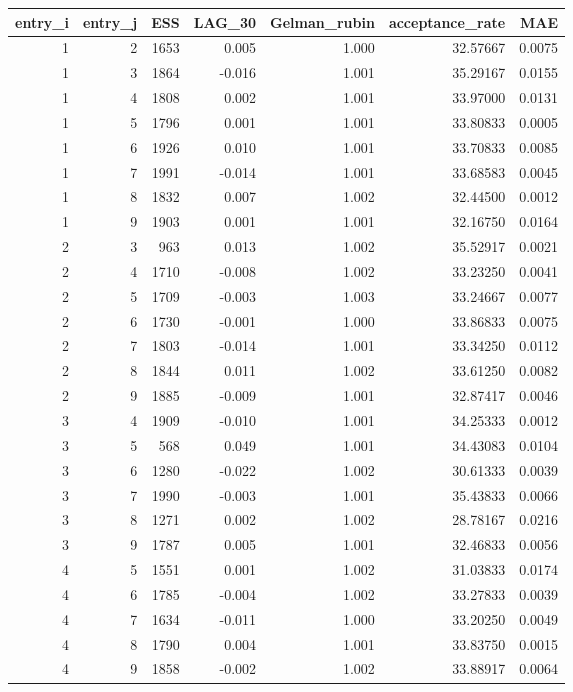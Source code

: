 \begin{longtable}{rrrrrrr}
\toprule
entry\_i & entry\_j & ESS & LAG\_30 & Gelman\_rubin & acceptance\_rate & MAE \\ 
\midrule
1 & 2 & 1653 & 0.005 & 1.000 & 32.57667 & 0.0075 \\ 
1 & 3 & 1864 & -0.016 & 1.001 & 35.29167 & 0.0155 \\ 
1 & 4 & 1808 & 0.002 & 1.001 & 33.97000 & 0.0131 \\ 
1 & 5 & 1796 & 0.001 & 1.001 & 33.80833 & 0.0005 \\ 
1 & 6 & 1926 & 0.010 & 1.001 & 33.70833 & 0.0085 \\ 
1 & 7 & 1991 & -0.014 & 1.001 & 33.68583 & 0.0045 \\ 
1 & 8 & 1832 & 0.007 & 1.002 & 32.44500 & 0.0012 \\ 
1 & 9 & 1903 & 0.001 & 1.001 & 32.16750 & 0.0164 \\ 
2 & 3 & 963 & 0.013 & 1.002 & 35.52917 & 0.0021 \\ 
2 & 4 & 1710 & -0.008 & 1.002 & 33.23250 & 0.0041 \\ 
2 & 5 & 1709 & -0.003 & 1.003 & 33.24667 & 0.0077 \\ 
2 & 6 & 1730 & -0.001 & 1.000 & 33.86833 & 0.0075 \\ 
2 & 7 & 1803 & -0.014 & 1.001 & 33.34250 & 0.0112 \\ 
2 & 8 & 1844 & 0.011 & 1.002 & 33.61250 & 0.0082 \\ 
2 & 9 & 1885 & -0.009 & 1.001 & 32.87417 & 0.0046 \\ 
3 & 4 & 1909 & -0.010 & 1.001 & 34.25333 & 0.0012 \\ 
3 & 5 & 568 & 0.049 & 1.001 & 34.43083 & 0.0104 \\ 
3 & 6 & 1280 & -0.022 & 1.002 & 30.61333 & 0.0039 \\ 
3 & 7 & 1990 & -0.003 & 1.001 & 35.43833 & 0.0066 \\ 
3 & 8 & 1271 & 0.002 & 1.002 & 28.78167 & 0.0216 \\ 
3 & 9 & 1787 & 0.005 & 1.001 & 32.46833 & 0.0056 \\ 
4 & 5 & 1551 & 0.001 & 1.002 & 31.03833 & 0.0174 \\ 
4 & 6 & 1785 & -0.004 & 1.002 & 33.27833 & 0.0039 \\ 
4 & 7 & 1634 & -0.011 & 1.000 & 33.20250 & 0.0049 \\ 
4 & 8 & 1790 & 0.004 & 1.001 & 33.83750 & 0.0015 \\ 
4 & 9 & 1858 & -0.002 & 1.002 & 33.88917 & 0.0064 \\ 

\end{longtable}
